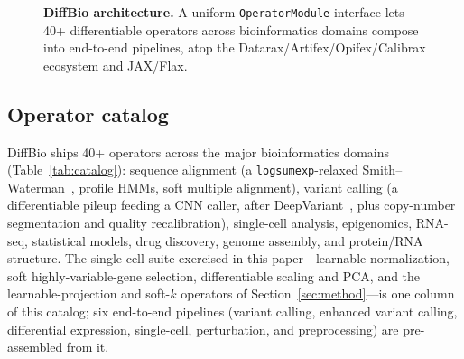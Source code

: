 \documentclass[10pt,twocolumn]{article}
\begin{document}
\begin{figure}[t]
\centering
{}
\caption{\textbf{DiffBio architecture.} A uniform \texttt{OperatorModule} interface lets
40+ differentiable operators across bioinformatics domains compose into end-to-end
pipelines, atop the Datarax/Artifex/Opifex/Calibrax ecosystem and JAX/Flax.}
\label{fig:arch}
\end{figure}

\subsection{Operator catalog}

DiffBio ships 40+ operators across the major bioinformatics domains
(Table~\ref{tab:catalog}): sequence alignment (a \texttt{logsumexp}-relaxed
Smith--Waterman~\citep{smith1981identification}, profile HMMs, soft multiple alignment),
variant calling (a differentiable pileup feeding a CNN caller, after
DeepVariant~\citep{poplin2018deepvariant}, plus copy-number segmentation and quality
recalibration), single-cell analysis, epigenomics, RNA-seq, statistical models, drug
discovery, genome assembly, and protein/RNA structure. The single-cell suite exercised in
this paper---learnable normalization, soft highly-variable-gene selection, differentiable
scaling and PCA, and the learnable-projection and soft-$k$ operators of
Section~\ref{sec:method}---is one column of this catalog; six end-to-end pipelines (variant
calling, enhanced variant calling, differential expression, single-cell, perturbation, and
preprocessing) are pre-assembled from it.
\end{document}
